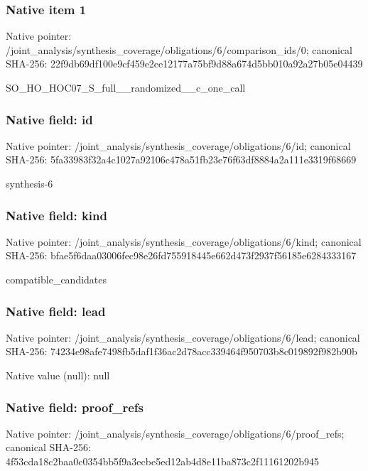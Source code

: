 \documentclass[10pt,a4paper]{article}
\begin{document}
\subsubsection{Native item 1}
Native pointer: /joint\_\allowbreak{}analysis/synthesis\_\allowbreak{}coverage/obligations/6/comparison\_\allowbreak{}ids/0; canonical SHA-256: 22f9db69df100e9cf459e2ce12177a75bf9d88a674d5bb010a92a27b05e04439

\begingroup\raggedright\sloppy SO\_\allowbreak{}HO\_\allowbreak{}HOC07\_\allowbreak{}S\_\allowbreak{}full\_\allowbreak{}\_\allowbreak{}randomized\_\allowbreak{}\_\allowbreak{}c\_\allowbreak{}one\_\allowbreak{}call\par\endgroup

\subsubsection{Native field: id}
Native pointer: /joint\_\allowbreak{}analysis/synthesis\_\allowbreak{}coverage/obligations/6/id; canonical SHA-256: 5fa33983f32a4c1027a92106c478a51fb23e76f63df8884a2a111e3319f68669

\begingroup\raggedright\sloppy synthesis-6\par\endgroup

\subsubsection{Native field: kind}
Native pointer: /joint\_\allowbreak{}analysis/synthesis\_\allowbreak{}coverage/obligations/6/kind; canonical SHA-256: bfae5f6daa03006fec98e26fd755918445e662d473f2937f56185e6284333167

\begingroup\raggedright\sloppy compatible\_\allowbreak{}candidates\par\endgroup

\subsubsection{Native field: lead}
Native pointer: /joint\_\allowbreak{}analysis/synthesis\_\allowbreak{}coverage/obligations/6/lead; canonical SHA-256: 74234e98afe7498fb5daf1f36ac2d78acc339464f950703b8c019892f982b90b

Native value (null): null

\subsubsection{Native field: proof\_\allowbreak{}refs}
Native pointer: /joint\_\allowbreak{}analysis/synthesis\_\allowbreak{}coverage/obligations/6/proof\_\allowbreak{}refs; canonical SHA-256: 4f53cda18c2baa0c0354bb5f9a3ecbe5ed12ab4d8e11ba873c2f11161202b945
\end{document}
